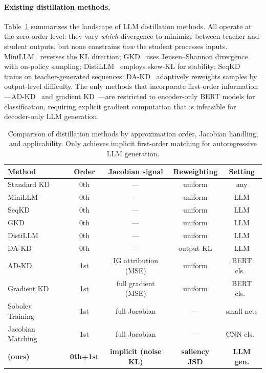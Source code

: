 \paragraph{Existing distillation methods.}
Table~\ref{tab:methods} summarizes the landscape of LLM distillation methods.
All operate at the zero-order level: they vary \emph{which} divergence to minimize between teacher and student outputs, but none constrains \emph{how} the student processes inputs.
MiniLLM~\citep{gu2024minillm} reverses the KL direction;
GKD~\citep{agarwal2024gkd} uses Jensen--Shannon divergence with on-policy sampling;
DistiLLM~\citep{ko2024distillm} employs skew-KL for stability;
SeqKD~\citep{kim2016sequence} trains on teacher-generated sequences;
DA-KD~\citep{dakd2025} adaptively reweights samples by output-level difficulty.
The only methods that incorporate first-order information---AD-KD~\citep{wu-etal-2023-ad} and gradient KD~\citep{wang2022gkd}---are restricted to encoder-only BERT models for classification, requiring explicit gradient computation that is infeasible for decoder-only LLM generation.

\begin{table}[t]
\centering
\caption{Comparison of distillation methods by approximation order, Jacobian handling, and applicability. Only \sagd{} achieves implicit first-order matching for autoregressive LLM generation.}
\label{tab:methods}
\small
\begin{tabular}{@{}lcccc@{}}
\toprule
\textbf{Method} & \textbf{Order} & \textbf{Jacobian signal} & \textbf{Reweighting} & \textbf{Setting} \\
\midrule
Standard KD~\citep{hinton2015distilling} & 0th & --- & uniform & any \\
MiniLLM~\citep{gu2024minillm} & 0th & --- & uniform & LLM \\
SeqKD~\citep{kim2016sequence} & 0th & --- & uniform & LLM \\
GKD~\citep{agarwal2024gkd} & 0th & --- & uniform & LLM \\
DistiLLM~\citep{ko2024distillm} & 0th & --- & uniform & LLM \\
DA-KD~\citep{dakd2025} & 0th & --- & output KL & LLM \\
\midrule
AD-KD~\citep{wu-etal-2023-ad} & 1st & IG attribution (MSE) & uniform & BERT cls.\ \\
Gradient KD~\citep{wang2022gkd} & 1st & full gradient (MSE) & uniform & BERT cls.\ \\
Sobolev Training~\citep{czarnecki2017sobolev} & 1st & full Jacobian & --- & small nets \\
Jacobian Matching~\citep{srinivas2018knowledge} & 1st & full Jacobian & --- & CNN cls.\ \\
\midrule
\textbf{\sagd{} (ours)} & \textbf{0th+1st} & \textbf{implicit (noise KL)} & \textbf{saliency JSD} & \textbf{LLM gen.} \\
\bottomrule
\end{tabular}
\end{table}
